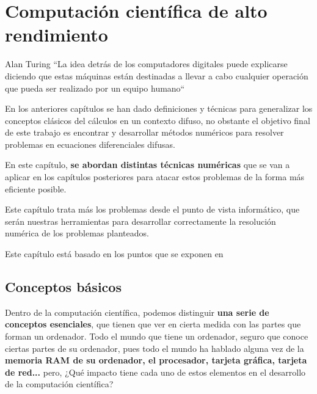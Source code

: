 
\chapter{Computación científica de alto rendimiento}
\begin{chapquote}{Alan Turing}
	``La idea detrás de los computadores digitales puede explicarse diciendo que estas máquinas están destinadas a llevar a cabo cualquier operación que pueda ser realizado por un equipo humano``
\end{chapquote}
En los anteriores capítulos se han dado definiciones y técnicas para generalizar los conceptos clásicos del cálculos en un contexto difuso, no obstante el objetivo final de este trabajo es encontrar y desarrollar métodos numéricos para resolver problemas en ecuaciones diferenciales difusas.

En este capítulo, \textbf{se abordan distintas técnicas numéricas} que se van a aplicar en los capítulos posteriores para atacar estos problemas de la forma más eficiente posible. 

Este capítulo trata más los problemas desde el punto de vista informático, que serán nuestras herramientas para desarrollar correctamente la resolución numérica de los problemas planteados.

Este capítulo está basado en los puntos que se exponen en \cite{paralelo}

\section{Conceptos básicos}
Dentro de la computación científica, podemos distinguir \textbf{una serie de conceptos esenciales}, que tienen que ver en cierta medida con las partes que forman un ordenador. Todo el mundo que tiene un ordenador, seguro que conoce ciertas partes de su ordenador, pues todo el mundo ha hablado alguna vez de la \textbf{memoria RAM de su ordenador, el procesador, tarjeta gráfica, tarjeta de red...} pero, ¿Qué impacto tiene cada uno de estos elementos en el desarrollo de la computación científica?

